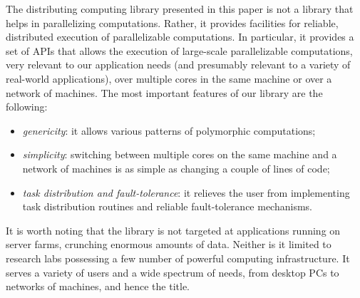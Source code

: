 \documentclass[preprint]{sigplanconf}
\begin{document}
The distributing computing library presented in this paper is not a
library that helps in parallelizing computations. Rather, it provides
facilities for reliable, distributed execution of parallelizable
computations. In particular, it provides a set of APIs that allows the
execution of large-scale parallelizable computations, very relevant to
our application needs (and presumably relevant to a variety of
real-world applications), over multiple cores in the same machine or
over a network of machines. The most important features of our library
are the following:
\begin{itemize}
\item \emph{genericity}: 
  it allows various patterns of polymorphic computations;
\item \emph{simplicity}: switching between multiple cores on the same
  machine and a network of machines is as simple as changing a couple
  of lines of code;
\item \emph{task distribution and fault-tolerance}: 
  it relieves the user from implementing task distribution routines
  and reliable fault-tolerance mechanisms.
\end{itemize}
It is worth noting that the library is not targeted at applications
running on server farms, crunching enormous amounts of data. Neither
is it limited to research labs possessing a few number of powerful
computing infrastructure. It serves a variety of users and a wide
spectrum of needs, from desktop PCs to networks of machines, and hence
the title.
\end{document}
